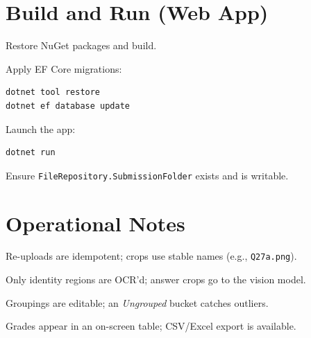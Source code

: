 \documentclass[ms,twoside,print]{nuthesis}
\begin{document}
\section{Build and Run (Web App)}
\begin{compactenum}
  \item Restore NuGet packages and build.
  \item Apply EF Core migrations:
\begin{lstlisting}
dotnet tool restore
dotnet ef database update
\end{lstlisting}
  \item Launch the app:
\begin{lstlisting}
dotnet run
\end{lstlisting}
  \item Ensure \texttt{FileRepository.SubmissionFolder} exists and is writable.
\end{compactenum}

\section{Operational Notes}
\begin{compactitem}
  \item Re-uploads are idempotent; crops use stable names (e.g., \texttt{Q27a.png}).
  \item Only identity regions are OCR’d; answer crops go to the vision model.
  \item Groupings are editable; an \textit{Ungrouped} bucket catches outliers.
  \item Grades appear in an on-screen table; CSV/Excel export is available.
\end{compactitem}


\backmatter


\end{document}
